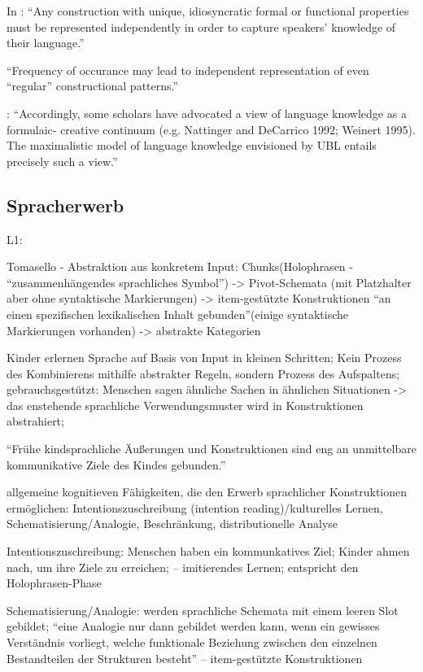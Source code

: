 \begin{itemize}
    In \cite{Ellis08}: ``Any construction with unique, idiosyncratic formal or functional properties must be represented independently in order to capture speakers' knowledge of their language.''

    ``Frequency of occurance may lead to independent representation of even ``regular'' constructional patterns.''

    \cite{Eskildsen08}: ``Accordingly,
    some scholars have advocated a view of language knowledge as a formulaic-
    creative continuum (e.g. Nattinger and DeCarrico 1992; Weinert 1995). The
    maximalistic model of language knowledge envisioned by UBL entails
    precisely such a view.''
\end{itemize}

\subsection{Spracherwerb}
    L1:

    Tomasello - Abstraktion aus konkretem Input: Chunks(Holophrasen - ``zusammenhängendes sprachliches Symbol'') -> Pivot-Schemata (mit Platzhalter aber ohne syntaktische Markierungen) -> item-gestützte Konstruktionen ``an einen spezifischen lexikalischen Inhalt gebunden''(einige syntaktische Markierungen vorhanden) -> abstrakte Kategorien

        \cite{Tomasello06} Kinder erlernen Sprache auf Basis von Input in kleinen Schritten;
        Kein Prozess des Kombinierens mithilfe abstrakter Regeln, sondern Prozess des Aufspaltens;
        gebrauchsgestützt: Menschen sagen ähnliche Sachen in ähnlichen Situationen -> das enstehende sprachliche Verwendungsmuster wird in Konstruktionen abstrahiert;

        ``Frühe kindsprachliche Äußerungen und Konstruktionen sind eng an unmittelbare kommunikative Ziele des Kindes gebunden.''

        allgemeine kognitieven Fähigkeiten, die den Erwerb sprachlicher Konstruktionen ermöglichen: Intentionszuschreibung (intention reading)/kulturelles Lernen, Schematisierung/Analogie, Beschränkung, distributionelle Analyse

        Intentionszuschreibung: Menschen haben ein kommunkatives Ziel; Kinder ahmen nach, um ihre Ziele zu erreichen; -- imitierendes Lernen; entspricht den Holophrasen-Phase

        Schematisierung/Analogie: werden sprachliche Schemata mit einem leeren Slot gebildet;
        ``eine Analogie nur dann gebildet werden kann, wenn ein gewisses Verständnis vorliegt, welche funktionale Beziehung zwischen den einzelnen Bestandteilen der Strukturen besteht''
        -- item-gestützte Konstruktionen

